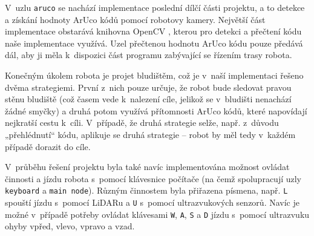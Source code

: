 V~uzlu \texttt{aruco} se nachází implementace poslední dílčí části projektu, a to detekce a získání hodnoty ArUco kódů pomocí robotovy kamery. Největší část implementace obstarává knihovna OpenCV \cite{opencv}, kterou pro detekci a přečtení kódu naše implementace využívá. Uzel přečtenou hodnotu ArUco kódu pouze předává dál, aby ji měla k~dispozici část programu zabývající se řízením trasy robota.

Konečným úkolem robota je projet bludištěm, což je v~naší implementaci řešeno dvěma strategiemi. První z~nich pouze určuje, že robot bude sledovat pravou stěnu bludiště (což časem vede k~nalezení cíle, jelikož se v~bludišti nenachází žádné smyčky) a druhá potom využívá přítomnosti ArUco kódů, které napovídají nejkratší cestu k~cíli. V~případě, že druhá strategie selže, např. z~důvodu „přehlédnutí“ kódu, aplikuje se druhá strategie – robot by měl tedy v~každém případě dorazit do cíle.

V~průběhu řešení projektu byla také navíc implementována možnost ovládat činnosti a jízdu robota s~pomocí klávesnice počítače (na čemž spolupracují uzly \texttt{keyboard} a \texttt{main node}). Různým činnostem byla přiřazena písmena, např. \texttt{L} spouští jízdu s~pomocí LiDARu a \texttt{U} s~pomocí ultrazvukových senzorů. Navíc je možné v~případě potřeby ovládat klávesami \texttt{W}, \texttt{A}, \texttt{S} a \texttt{D} jízdu s~pomocí ultrazvuku ohyby vpřed, vlevo, vpravo a vzad.
